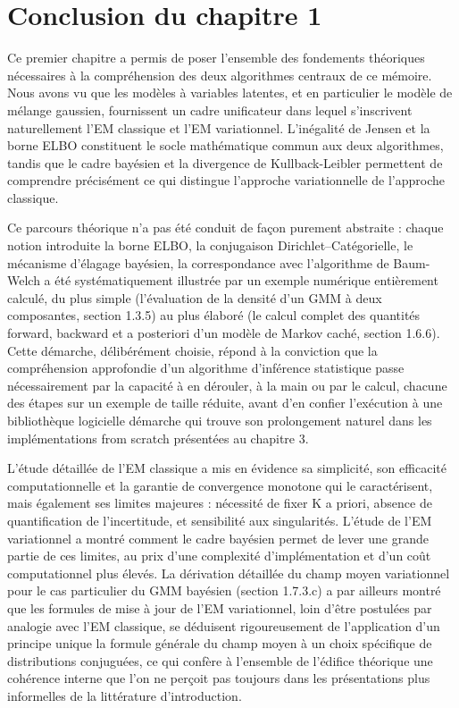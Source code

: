 \section{Conclusion du chapitre 1}
Ce premier chapitre a permis de poser l'ensemble des fondements théoriques nécessaires à la compréhension des deux algorithmes centraux de ce mémoire. Nous avons vu que les modèles à variables latentes, et en particulier le modèle de mélange gaussien, fournissent un cadre unificateur dans lequel s'inscrivent naturellement l'EM classique et l'EM variationnel. L'inégalité de Jensen et la borne ELBO constituent le socle mathématique commun aux deux algorithmes, tandis que le cadre bayésien et la divergence de Kullback-Leibler permettent de comprendre précisément ce qui distingue l'approche variationnelle de l'approche classique.

Ce parcours théorique n'a pas été conduit de façon purement abstraite : chaque notion introduite  la borne ELBO, la conjugaison Dirichlet--Catégorielle, le mécanisme d'élagage bayésien, la correspondance avec l'algorithme de Baum-Welch  a été systématiquement illustrée par un exemple numérique entièrement calculé, du plus simple (l'évaluation de la densité d'un GMM à deux composantes, section 1.3.5) au plus élaboré (le calcul complet des quantités forward, backward et a posteriori d'un modèle de Markov caché, section 1.6.6). Cette démarche, délibérément choisie, répond à la conviction que la compréhension approfondie d'un algorithme d'inférence statistique passe nécessairement par la capacité à en dérouler, à la main ou par le calcul, chacune des étapes sur un exemple de taille réduite, avant d'en confier l'exécution à une bibliothèque logicielle  démarche qui trouve son prolongement naturel dans les implémentations from scratch présentées au chapitre 3.

L'étude détaillée de l'EM classique a mis en évidence sa simplicité, son efficacité computationnelle et la garantie de convergence monotone qui le caractérisent, mais également ses limites majeures : nécessité de fixer K a priori, absence de quantification de l'incertitude, et sensibilité aux singularités. L'étude de l'EM variationnel a montré comment le cadre bayésien permet de lever une grande partie de ces limites, au prix d'une complexité d'implémentation et d'un coût computationnel plus élevés. La dérivation détaillée du champ moyen variationnel pour le cas particulier du GMM bayésien (section 1.7.3.c) a par ailleurs montré que les formules de mise à jour de l'EM variationnel, loin d'être postulées par analogie avec l'EM classique, se déduisent rigoureusement de l'application d'un principe unique  la formule générale du champ moyen  à un choix spécifique de distributions conjuguées, ce qui confère à l'ensemble de l'édifice théorique une cohérence interne que l'on ne perçoit pas toujours dans les présentations plus informelles de la littérature d'introduction.

